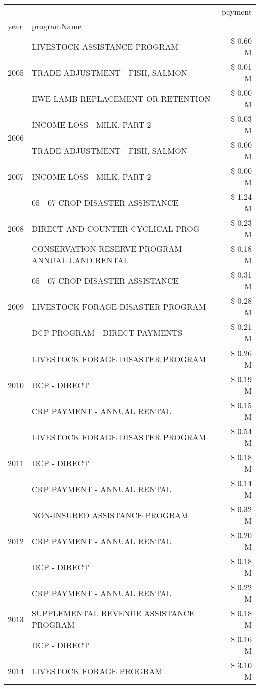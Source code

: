 \begin{tabular}{llr}
\toprule
 &  & payment \\
year & programName &  \\
\midrule
\multirow[t]{3}{*}{2005} & LIVESTOCK ASSISTANCE PROGRAM & \$ 0.60 M \\
 & TRADE ADJUSTMENT - FISH, SALMON & \$ 0.01 M \\
 & EWE LAMB REPLACEMENT OR RETENTION & \$ 0.00 M \\
\cline{1-3}
\multirow[t]{2}{*}{2006} & INCOME LOSS - MILK, PART 2 & \$ 0.03 M \\
 & TRADE ADJUSTMENT - FISH, SALMON & \$ 0.00 M \\
\cline{1-3}
2007 & INCOME LOSS - MILK, PART 2 & \$ 0.00 M \\
\cline{1-3}
\multirow[t]{3}{*}{2008} & 05 - 07 CROP DISASTER ASSISTANCE & \$ 1.24 M \\
 & DIRECT AND COUNTER CYCLICAL PROG & \$ 0.23 M \\
 & CONSERVATION RESERVE PROGRAM - ANNUAL LAND RENTAL & \$ 0.18 M \\
\cline{1-3}
\multirow[t]{3}{*}{2009} & 05 - 07 CROP DISASTER ASSISTANCE & \$ 0.31 M \\
 & LIVESTOCK FORAGE DISASTER  PROGRAM & \$ 0.28 M \\
 & DCP PROGRAM - DIRECT PAYMENTS & \$ 0.21 M \\
\cline{1-3}
\multirow[t]{3}{*}{2010} & LIVESTOCK FORAGE DISASTER PROGRAM & \$ 0.26 M \\
 & DCP - DIRECT & \$ 0.19 M \\
 & CRP PAYMENT - ANNUAL RENTAL & \$ 0.15 M \\
\cline{1-3}
\multirow[t]{3}{*}{2011} & LIVESTOCK FORAGE DISASTER PROGRAM & \$ 0.54 M \\
 & DCP - DIRECT & \$ 0.18 M \\
 & CRP PAYMENT - ANNUAL RENTAL & \$ 0.14 M \\
\cline{1-3}
\multirow[t]{3}{*}{2012} & NON-INSURED ASSISTANCE PROGRAM & \$ 0.32 M \\
 & CRP PAYMENT - ANNUAL RENTAL & \$ 0.20 M \\
 & DCP - DIRECT & \$ 0.18 M \\
\cline{1-3}
\multirow[t]{3}{*}{2013} & CRP PAYMENT - ANNUAL RENTAL & \$ 0.22 M \\
 & SUPPLEMENTAL REVENUE ASSISTANCE PROGRAM & \$ 0.18 M \\
 & DCP - DIRECT & \$ 0.16 M \\
\cline{1-3}
\multirow[t]{3}{*}{2014} & LIVESTOCK FORAGE PROGRAM & \$ 3.10 M \\

\end{tabular}
